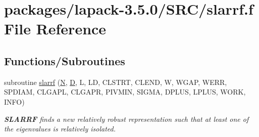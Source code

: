 \hypertarget{slarrf_8f}{}\section{packages/lapack-\/3.5.0/\+S\+R\+C/slarrf.f File Reference}
\label{slarrf_8f}
\subsection*{Functions/\+Subroutines}
\begin{DoxyCompactItemize}
\item 
subroutine \hyperlink{group__auxOTHERauxiliary_gaaf557670fb7f0616fb74b6af8cae353b}{slarrf} (\hyperlink{polmisc_8c_a0240ac851181b84ac374872dc5434ee4}{N}, \hyperlink{odrpack_8h_a7dae6ea403d00f3687f24a874e67d139}{D}, L, L\+D, C\+L\+S\+T\+R\+T, C\+L\+E\+N\+D, W, W\+G\+A\+P, W\+E\+R\+R, S\+P\+D\+I\+A\+M, C\+L\+G\+A\+P\+L, C\+L\+G\+A\+P\+R, P\+I\+V\+M\+I\+N, S\+I\+G\+M\+A, D\+P\+L\+U\+S, L\+P\+L\+U\+S, W\+O\+R\+K, I\+N\+F\+O)
\begin{DoxyCompactList}\small\item\em {\bfseries S\+L\+A\+R\+R\+F} finds a new relatively robust representation such that at least one of the eigenvalues is relatively isolated. \end{DoxyCompactList}\end{DoxyCompactItemize}
